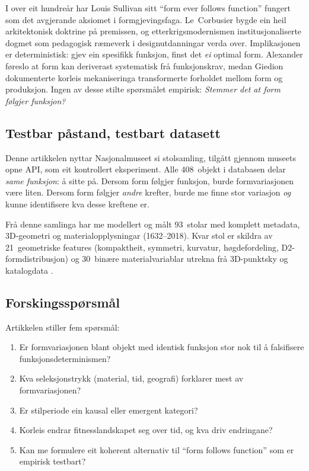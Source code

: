\documentclass[12pt,a4paper]{article}
\begin{document}
I over eit hundre\aa{}r har Louis Sullivan sitt \enquote{form ever follows function} \citep{sullivan1896} fungert som det avgjerande aksiomet i formgjevingsfaga. Le~Corbusier \citep{corbusier1923} bygde ein heil arkitektonisk doktrine p\aa{} premissen, og etterkrigsmodernismen institusjonaliserte dogmet som pedagogisk r\ae{}meverk i designutdanningar verda over. Implikasjonen er deterministisk: gjev ein spesifikk funksjon, finst det \emph{ei} optimal form. Alexander \citep{alexander1964} f\o{}reslo at form kan deriverast systematisk fr\aa{} funksjonskrav, medan Giedion \citep{giedion1948} dokumenterte korleis mekaniseringa transformerte forholdet mellom form og produksjon. Ingen av desse stilte sp\o{}rsm\aa{}let empirisk: \emph{Stemmer det at form f\o{}lgjer funksjon?}

\subsection{Testbar p\aa{}stand, testbart datasett}

Denne artikkelen nyttar Nasjonalmuseet si stolsamling, tilg\aa{}tt gjennom museets opne API, som eit kontrollert eksperiment. Alle 408~objekt i databasen delar \emph{same funksjon}: \aa{} sitte p\aa{}. Dersom form f\o{}lgjer funksjon, burde formvariasjonen v\ae{}re liten. Dersom form f\o{}lgjer \emph{andre} krefter, burde me finne stor variasjon \emph{og} kunne identifisere kva desse kreftene er.

Fr\aa{} denne samlinga har me modellert og m\aa{}lt 93~stolar med komplett metadata, 3D-geometri og materialopplysningar (1632--2018). Kvar stol er skildra av 21~geometriske features (kompaktheit, symmetri, kurvatur, h\o{}gdefordeling, D2-formdistribusjon) og 30~bin\ae{}re materialvariablar utrekna fr\aa{} 3D-punktsky og katalogdata \citep{finne2026c}.

\subsection{Forskingssp\o{}rsm\aa{}l}

Artikkelen stiller fem sp\o{}rsm\aa{}l:
\begin{enumerate}[nosep]
    \item Er formvariasjonen blant objekt med identisk funksjon stor nok til \aa{} falsifisere funksjonsdeterminismen?
    \item Kva seleksjonstrykk (material, tid, geografi) forklarer mest av formvariasjonen?
    \item Er stilperiode ein kausal eller emergent kategori?
    \item Korleis endrar fitnesslandskapet seg over tid, og kva driv endringane?
    \item Kan me formulere eit koherent alternativ til \enquote{form follows function} som er empirisk testbart?
\end{enumerate}
\end{document}
